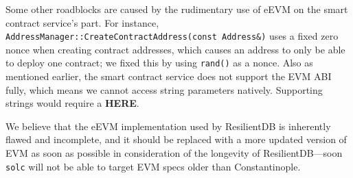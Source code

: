 Some other roadblocks are caused by the rudimentary use of eEVM on the smart contract service’s
part. For instance, \verb|AddressManager::CreateContractAddress(const Address&)| uses a fixed zero
nonce when creating contract addresses, which causes an address to only be able to deploy one
contract; we fixed this by using \verb|rand()| as a nonce. Also as mentioned earlier, the smart
contract service does not support the EVM ABI fully, which means we cannot access string parameters
natively. Supporting strings would require a \textbf{HERE}.

We believe that the eEVM implementation used by ResilientDB is inherently flawed and incomplete, and it should be replaced with a more updated version of EVM as soon as possible in consideration of the longevity of ResilientDB—soon \verb|solc| will not be able to target EVM specs older than Constantinople.

